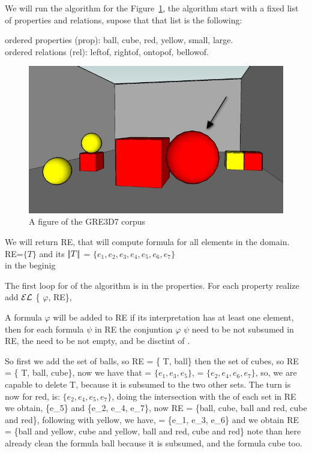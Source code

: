 We will run the algorithm for the Figure~\ref{figure22}, the algorithm start with a fixed list of properties and relations, supose that that list is the following:

ordered properties (prop): ball, cube, red, yellow, small, large.\\
ordered relations (rel): leftof, rightof, ontopof, bellowof.

\begin{figure}[h!]
\begin{center}
\includegraphics[width=.5\textwidth]{images/22.jpg}
\end{center}
\vspace*{-2em}
\caption{A figure of the GRE3D7 corpus}
\label{figure22}
\end{figure}

We will return RE, that will compute formula for all elements in the domain.\\

RE=$\{T\}$ and its $|\!|T|\!|$ = $\{e_1, e_2, e_3, e_4, e_5, e_6, e_7\}$\\ in the beginig 

The first loop for of the algorithm is in the properties. For each property realize add $\mathcal{EL}$ \{ $\varphi$, RE\},

A formula $\varphi$ will be added to RE if its interpretation has at least one element, then for each formula $\psi$ in RE the conjuntion $\varphi$ \cup $\psi$ need to be not subsumed in RE, the \interp{$\varphi$ \cup $\psi$} need to be not empty, and be disctint of \interp{$\psi$}. 

So first we add the set of balls, so RE = \{ T, ball\} then the set of cubes, so RE = \{ T, ball, cube\}, now we have that  = $\{ e_1, e_3, e_5 \}$,  = $\{ e_2, e_4, e_6, e_7 \}$, so, we are capable to delete T, because it is subsumed to the two other sets. The turn is now for red,  is: $\{e_2, e_4, e_5, e_7\}$, doing the intersection with the  of each set in RE we obtain, \{e_5\} and  \{e_2, e_4, e_7\}, now RE = \{ball, cube, ball and red, cube and red\}, following with yellow, we have,  = \{e_1, e_3, e_6\} and we obtain RE = \{ball and yellow, cube and yellow, ball and red, cube and red\} note than here already clean the formula ball because it is subsumed, and the formula cube too.


